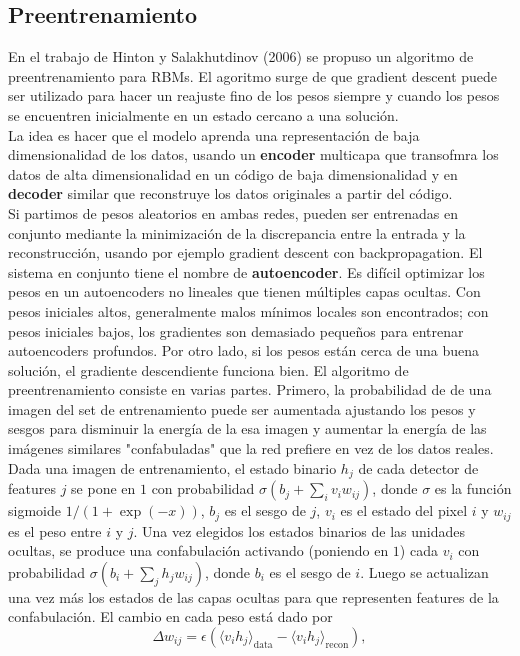 \documentclass[12pt,a4paper]{article}
\begin{document}
\subsection{Preentrenamiento}
En el trabajo de Hinton y Salakhutdinov (2006) se propuso un algoritmo de preentrenamiento para RBMs. El agoritmo surge de que gradient descent puede ser utilizado para hacer un reajuste fino de los pesos siempre y cuando los pesos se encuentren inicialmente en un estado cercano a una solución.\\
La idea es hacer que el modelo aprenda una representación de baja dimensionalidad de los datos, usando un \textbf{encoder} multicapa que transofmra los datos de alta dimensionalidad en un código de baja dimensionalidad y en \textbf{decoder} similar que reconstruye los datos originales a partir del código.\\
Si partimos de pesos aleatorios en ambas redes, pueden ser entrenadas en conjunto mediante la minimización de la discrepancia entre la entrada y la reconstrucción, usando por ejemplo gradient descent con backpropagation. El sistema en conjunto tiene el nombre de \textbf{autoencoder}.
Es difícil optimizar los pesos en un autoencoders no lineales que tienen múltiples capas ocultas. Con pesos iniciales altos, generalmente malos mínimos locales son encontrados; con pesos iniciales bajos, los gradientes son demasiado pequeños para entrenar autoencoders profundos. Por otro lado, si los pesos están cerca de una buena solución, el gradiente descendiente funciona bien.
El algoritmo de preentrenamiento consiste en varias partes. Primero, la probabilidad de de una imagen del set de entrenamiento puede ser aumentada ajustando los pesos y sesgos para disminuir la energía de la esa imagen y aumentar la energía de las imágenes similares "confabuladas" que la red prefiere en vez de los datos reales. Dada una imagen de entrenamiento, el estado binario $h_j$ de cada detector de features $j$ se pone en $1$ con probabilidad $\sigma(b_j+\sum_i v_i w_{ij})$, donde $\sigma$ es la función sigmoide $1/(1+\exp(-x))$, $b_j$ es el sesgo de $j$, $v_i$ es el estado del pixel $i$ y $w_{ij}$ es el peso entre $i$ y $j$.
Una vez elegidos los estados binarios de las unidades ocultas, se produce una confabulación activando (poniendo en $1$) cada $v_i$ con probabilidad $\sigma(b_i + \sum_j h_j w_{ij})$, donde $b_i$ es el sesgo de $i$. Luego se actualizan una vez más los estados de las capas ocultas para que representen features de la confabulación. El cambio en cada peso está dado por
$$
\Delta w_{ij} = \epsilon(\langle v_i h_j \rangle_\text{data} - \langle v_i h_j \rangle_\text{recon}),
$$
\end{document}

